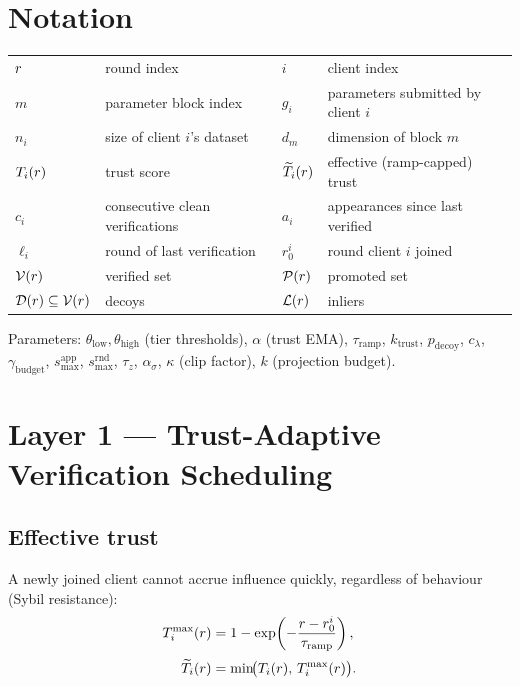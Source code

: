 \section{Notation}

\begin{center}
\begin{tabular}{@{}ll@{\qquad}ll@{}}
\toprule
$r$ & round index & $i$ & client index \\
$m$ & parameter block index & $g_i$ & parameters submitted by client $i$ \\
$n_i$ & size of client $i$'s dataset & $d_m$ & dimension of block $m$ \\
$T_i(r)$ & trust score & $\widetilde{T}_i(r)$ & effective (ramp-capped) trust \\
$c_i$ & consecutive clean verifications & $a_i$ & appearances since last verified \\
$\ell_i$ & round of last verification & $r_0^i$ & round client $i$ joined \\
$\mathcal{V}(r)$ & verified set & $\mathcal{P}(r)$ & promoted set \\
$\mathcal{D}(r)\subseteq\mathcal{V}(r)$ & decoys & $\mathcal{L}(r)$ & inliers \\
\bottomrule
\end{tabular}
\end{center}

\medskip
\noindent
Parameters: $\theta_{\mathrm{low}},\theta_{\mathrm{high}}$ (tier thresholds),
$\alpha$ (trust EMA), $\tau_{\mathrm{ramp}}$, $k_{\mathrm{trust}}$,
$p_{\mathrm{decoy}}$, $c_\lambda$, $\gamma_{\mathrm{budget}}$,
$s^{\mathrm{app}}_{\max}$, $s^{\mathrm{rnd}}_{\max}$,
$\tau_z$, $\alpha_\sigma$, $\kappa$ (clip factor), $k$ (projection budget).

\section{Layer 1 --- Trust-Adaptive Verification Scheduling}

\subsection{Effective trust}

A newly joined client cannot accrue influence quickly, regardless of behaviour
(Sybil resistance):
\begin{align}
T^{\max}_i(r) &= 1 - \exp\!\left(-\frac{r - r_0^i}{\tau_{\mathrm{ramp}}}\right),
\label{eq:ramp}\\[2pt]
\widetilde{T}_i(r)    &= \min\!\bigl(T_i(r),\, T^{\max}_i(r)\bigr).
\label{eq:efftrust}
\end{align}

